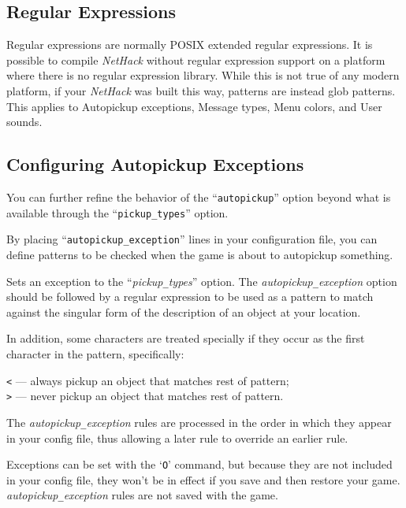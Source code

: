 \subsection*{Regular Expressions}

Regular expressions are normally POSIX extended regular expressions. It is
possible to compile {\it NetHack\/} without regular expression support on
a platform where
there is no regular expression library. While this is not true of any modern
platform, if your {\it NetHack\/} was built this way, patterns are instead glob
patterns. This applies to Autopickup exceptions, Message types, Menu colors,
and User sounds.

\subsection*{Configuring Autopickup Exceptions}

You can further refine the behavior of the ``{\tt autopickup}'' option
beyond what is available through the ``{\tt pickup\verb+_+types}'' option.

By placing ``{\tt autopickup\verb+_+exception}'' lines in your configuration
file, you can define patterns to be checked when the game is about to
autopickup something.

\blist{}
\item[\ib{autopickup\verb+_+exception}]
Sets an exception to the ``{\it pickup\verb+_+types}'' option.
The {\it autopickup\verb+_+exception\/} option should be followed by a regular
expression to be used as a pattern to match against the singular form of the
description of an object at your location.

In addition, some characters are treated specially if they occur as the first
character in the pattern, specifically:

{\tt <} --- always pickup an object that matches rest of pattern;\\
{\tt >} --- never pickup an object that matches rest of pattern.

The {\it autopickup\verb+_+exception\/} rules are processed in the order 
in which they appear in your config file, thus allowing a later rule to override
an earlier rule.

Exceptions can be set with the `{\tt O}' command, but because they are not included
in your config file, they won't be in effect if you save and then restore your game.
{\it autopickup\verb+_+exception\/} rules are not saved with the game.
\elist

